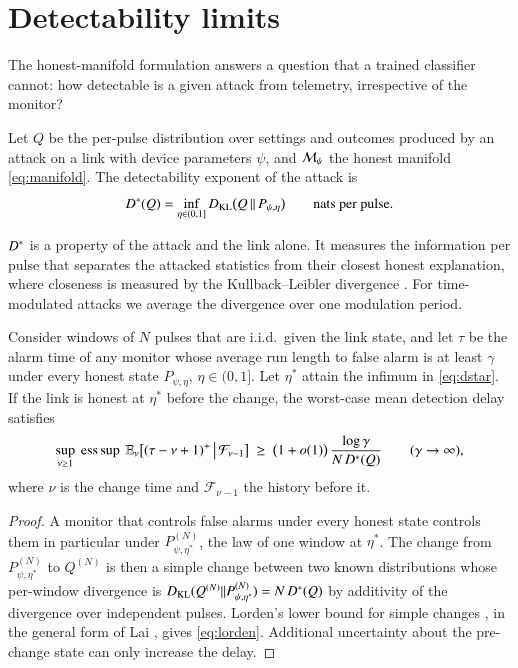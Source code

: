 \section{Detectability limits}\label{sec:theory}

The honest-manifold formulation answers a question that a trained classifier cannot: how detectable is a given attack from telemetry, irrespective of the monitor?

\begin{definition}\label{def:dstar}
Let $Q$ be the per-pulse distribution over settings and outcomes produced by an attack on a link with device parameters $\psi$, and $\mathcal{M}_\psi$ the honest manifold \eqref{eq:manifold}. The detectability exponent of the attack is
\begin{equation}
D^{\ast}(Q)=\inf_{\eta\in(0,1]}D_{\mathrm{KL}}\bigl(Q\,\Vert\,P_{\psi,\eta}\bigr)\qquad\text{nats per pulse}. \label{eq:dstar}
\end{equation}
\end{definition}

$D^{\ast}$ is a property of the attack and the link alone. It measures the information per pulse that separates the attacked statistics from their closest honest explanation, where closeness is measured by the Kullback--Leibler divergence \cite{KullbackLeibler1951,CoverThomas2006}. For time-modulated attacks we average the divergence over one modulation period.

\begin{proposition}\label{prop:lorden}
Consider windows of $N$ pulses that are i.i.d.\ given the link state, and let $\tau$ be the alarm time of any monitor whose average run length to false alarm is at least $\gamma$ under every honest state $P_{\psi,\eta}$, $\eta\in(0,1]$. Let $\eta^\ast$ attain the infimum in \eqref{eq:dstar}. If the link is honest at $\eta^\ast$ before the change, the worst-case mean detection delay satisfies
\begin{equation}
\sup_{\nu\ge1}\ \operatorname*{ess\,sup}\ \E_\nu\bigl[(\tau-\nu+1)^+\,\big\vert\,\mathcal{F}_{\nu-1}\bigr]\ \ge\ \bigl(1+o(1)\bigr)\,\frac{\log\gamma}{N\,\Dstar(Q)}\qquad(\gamma\to\infty), \label{eq:lorden}
\end{equation}
where $\nu$ is the change time and $\mathcal{F}_{\nu-1}$ the history before it.
\end{proposition}
\begin{proof}
A monitor that controls false alarms under every honest state controls them in particular under $P^{(N)}_{\psi,\eta^\ast}$, the law of one window at $\eta^\ast$. The change from $P^{(N)}_{\psi,\eta^\ast}$ to $Q^{(N)}$ is then a simple change between two known distributions whose per-window divergence is $D_{\mathrm{KL}}(Q^{(N)}\Vert P^{(N)}_{\psi,\eta^\ast})=N\,D^{\ast}(Q)$ by additivity of the divergence over independent pulses. Lorden's lower bound for simple changes \cite{Lorden1971}, in the general form of Lai \cite{Lai1998}, gives \eqref{eq:lorden}. Additional uncertainty about the pre-change state can only increase the delay.
\end{proof}

